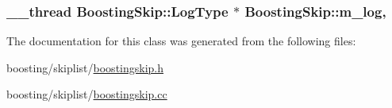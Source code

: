 \hypertarget{classBoostingSkip_a4a144bee7a632c2f4819fdd944273833}{
\subsubsection[{m\-\_\-log}]{\setlength{\rightskip}{0pt plus 5cm}\-\_\-\-\_\-thread {\bf Boosting\-Skip\-::\-Log\-Type} $\ast$ Boosting\-Skip\-::m\-\_\-log\hspace{0.3cm}{\ttfamily [static]}, {\ttfamily [private]}}}\label{classBoostingSkip_a4a144bee7a632c2f4819fdd944273833}


The documentation for this class was generated from the following files\-:\begin{DoxyCompactItemize}
\item 
boosting/skiplist/\hyperlink{boostingskip_8h}{boostingskip.\-h}\item 
boosting/skiplist/\hyperlink{boostingskip_8cc}{boostingskip.\-cc}\end{DoxyCompactItemize}
